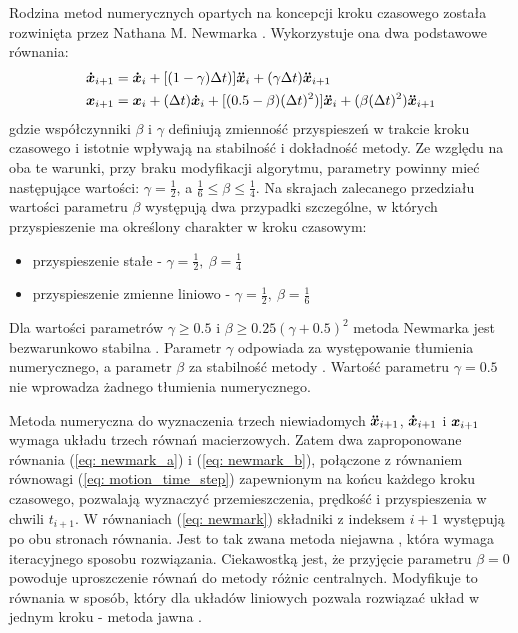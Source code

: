 Rodzina metod numerycznych opartych na koncepcji kroku czasowego została rozwinięta przez Nathana M. Newmarka \parencite{Newmark1959}. Wykorzystuje ona dwa podstawowe równania:
\begin{subequations} \label{eq: newmark}
	\begin{align}
		\bm{\dot{x}}_{i+1} &= \bm{\dot{x}}_{i} + [(1-\gamma)\Delta t)]\bm{\ddot{x}}_{i} + (\gamma\Delta t)\bm{\ddot{x}}_{i+1} 
		\label{eq: newmark_a}\\
		\bm{x}_{i+1} &= \bm{x}_{i} + (\Delta t)\bm{\dot{x}}_{i} + [(0.5-\beta)(\Delta t)^2)]\bm{\ddot{x}}_{i}+ (\beta(\Delta t)^2)\bm{\ddot{x}}_{i+1} 
		\label{eq: newmark_b}
	\end{align}
\end{subequations}
gdzie współczynniki $\beta$ i $\gamma$ definiują zmienność przyspieszeń w trakcie kroku czasowego i istotnie wpływają na stabilność i dokładność metody. Ze względu na oba te warunki, przy braku modyfikacji algorytmu, parametry powinny mieć następujące wartości: $\gamma = \frac{1}{2}$, a $ \frac{1}{6}\leq \beta \leq \frac{1}{4}$. Na skrajach zalecanego przedziału wartości parametru $\beta$ występują dwa przypadki szczególne, w których przyspieszenie ma określony charakter w kroku czasowym:
\begin{itemize}
	\item przyspieszenie stałe - $\gamma = \frac{1}{2},\: \beta = \frac{1}{4}$
	\item przyspieszenie zmienne liniowo - $\gamma = \frac{1}{2},\: \beta = \frac{1}{6}$
\end{itemize}

Dla wartości parametrów $\gamma\ge 0.5$ i $\beta\ge0.25(\gamma+0.5)^2$ metoda Newmarka jest bezwarunkowo stabilna \parencite{Rakowski2016}. Parametr $\gamma$ odpowiada za występowanie tłumienia numerycznego, a parametr $\beta$ za stabilność metody \parencite{Bajer2012}. Wartość parametru $\gamma=0.5$ nie wprowadza żadnego tłumienia numerycznego. 

Metoda numeryczna do wyznaczenia trzech niewiadomych $\bm{\ddot{x}}_{i+1}$, $\bm{\dot{x}}_{i+1}$ i $\bm{x}_{i+1}$ wymaga układu trzech równań macierzowych. Zatem dwa zaproponowane równania (\ref{eq: newmark_a}) i (\ref{eq: newmark_b}), połączone z równaniem równowagi (\ref{eq: motion_time_step}) zapewnionym na końcu każdego kroku czasowego, pozwalają wyznaczyć przemieszczenia, prędkość i przyspieszenia w chwili $t_{i+1}$. W równaniach (\ref{eq: newmark}) składniki z indeksem $i+1$ występują po obu stronach równania. Jest to tak zwana metoda niejawna , która wymaga iteracyjnego sposobu rozwiązania. Ciekawostką jest, że przyjęcie parametru $\beta=0$ powoduje uproszczenie równań do metody różnic centralnych. Modyfikuje to równania w sposób, który dla układów liniowych pozwala rozwiązać układ w jednym kroku - metoda jawna . 

